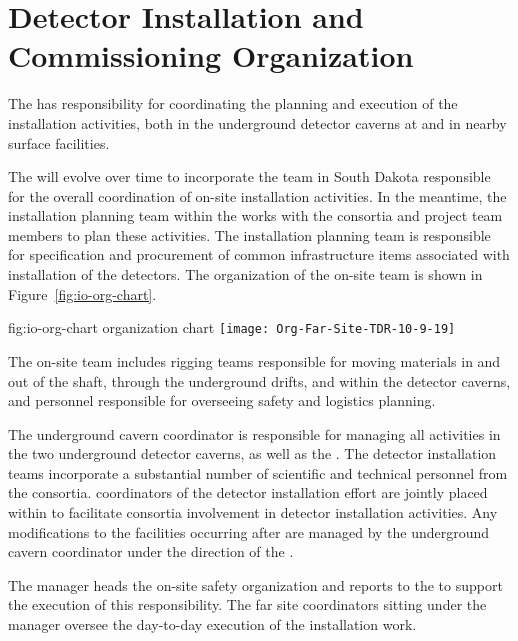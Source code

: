 \section{Detector Installation and Commissioning Organization}  %
\label{sec:es-tc-det-instal}

The  has
responsibility for coordinating the planning and execution of 
the  installation activities, both 
in the underground detector caverns at  and in 
nearby surface facilities. 

The   will evolve over 
time to incorporate the team in South Dakota responsible for the 
overall coordination of on-site installation activities.  In the 
meantime, the installation planning team within the  works with 
the  consortia and  project team members 
to plan these activities.  
The  installation planning team is responsible for specification 
and procurement of common infrastructure items associated with 
installation of the detectors. 
The organization of the on-site team is 
shown in Figure~\ref{fig:io-org-chart}. 
\begin{dunefigure}{fig:io-org-chart}
  { organization chart}
  \texttt{[image: Org-Far-Site-TDR-10-9-19]}
\end{dunefigure}


The on-site  team includes rigging teams responsible for moving 
materials in and out of the shaft, through the underground drifts, 
and within the detector caverns, and personnel responsible 
for overseeing safety and logistics planning. 

The underground cavern coordinator is responsible for managing all 
activities in the two underground detector caverns, as well as the
. The detector
installation teams incorporate a substantial number of scientific and
technical personnel from the  consortia.   coordinators 
of the detector installation effort are jointly placed within 
  to facilitate consortia involvement in  
detector installation activities.  Any modifications to the facilities 
occurring after  are managed by the underground cavern 
coordinator under the direction of the .

The 
 manager heads the on-site safety organization and reports
to the  to support the execution of this
responsibility. The far site  coordinators sitting under the
  manager oversee the day-to-day execution
of the installation work.

